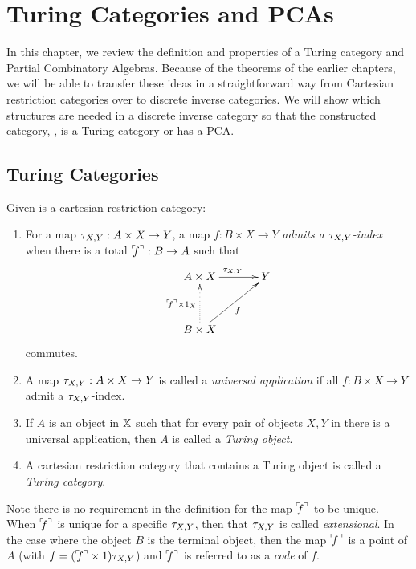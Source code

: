 \chapter{Turing Categories and PCAs} %
\label{chap:turing_categories}

In this chapter, we review the definition and properties of a Turing
category\cite{cockett-hostra08-intro-to-turing} and Partial Combinatory Algebras. Because of the
theorems of the earlier chapters, we will be able to transfer these ideas in a straightforward way
from Cartesian restriction categories over to discrete inverse categories. We will show which
structures are needed in a discrete inverse category \X so that the constructed category, \Xt, is a
Turing category or has a PCA.

\section{Turing Categories}
\label{sec:turing_category_definitions}


\begin{definition}\label{def:turing_category}
  Given \X is a cartesian restriction category:
  \begin{enumerate}
    \item For a map $\tau_{{X},{Y}}: A \times X \to Y$, a map $f:B\times X \to Y$ \emph{admits a $\tau_{{X},{Y}}$-index}
      when there is a total ${}^\ulcorner\!\!f^\urcorner:B\to A$ such that
      \[
        \xymatrix@C+10pt@R+10pt{
          A\times X \ar[r]^{\txy} & Y \\
          B\times X \ar@{.>}[u]^{\code{f}\times 1_X} \ar[ur]_f
        }
      \]
      commutes.\label{defitem:turing_admit_txy_index}
    \item A map $\tau_{{X},{Y}}: A \times X \to Y$ is called a \emph{universal application} if all
      $f:B\times X \to Y$ admit a $\tau_{{X},{Y}}$-index.\label{defitem:turing_universal_application}
    \item If $A$ is an object in $\mathbb{X}$ such that for every pair of objects $X,Y$ in \X there is
      a universal application, then $A$ is called a \emph{Turing object}.
    \item A cartesian restriction category that contains a Turing object is called a
      \emph{Turing category}.
  \end{enumerate}
\end{definition}

Note there is no requirement in the definition for the map ${}^\ulcorner\!\!f^\urcorner$ to be unique. When ${}^\ulcorner\!\!f^\urcorner$ is unique
for a specific $\tau_{{X},{Y}}$, then that $\tau_{{X},{Y}}$ is called \emph{extensional}. In the case where the object
$B$ is the terminal object, then the map ${}^\ulcorner\!\!f^\urcorner$ is a point of $A$ (with $f = ({}^\ulcorner\!\!f^\urcorner \times 1)\tau_{{X},{Y}}$) and
${}^\ulcorner\!\!f^\urcorner$ is referred to as a \emph{code} of $f$.

